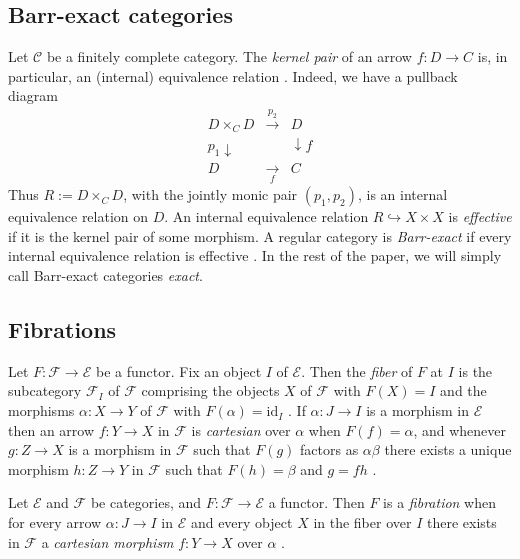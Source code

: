 \documentclass[12pt]{amsart}
\theoremstyle{definition}
\begin{document}
\subsection{Barr-exact categories}

Let $\mathcal{C}$ be a finitely complete category. The \emph{kernel pair} of
an arrow $f:D\rightarrow C$ is, in particular, an (internal) equivalence
relation \cite[Lemma~2.2]{gran_introduction_2021}. Indeed, we have a
pullback diagram%
\begin{equation*}
\begin{array}{ccc}
D\times _{C}D & \overset{p_{2}}{\rightarrow } & D \\ 
p_{1}\downarrow &  & \downarrow f \\ 
D & \underset{f}{\rightarrow } & C%
\end{array}%
\end{equation*}%
Thus $R:=D\times _{C}D$, with the jointly monic pair $(p_{1},p_{2})$, is an
internal equivalence relation on $D$. An internal equivalence relation $%
R\hookrightarrow X\times X$ is \emph{effective} if it is the kernel pair of
some morphism. A regular category is \emph{Barr-exact} if every internal
equivalence relation is effective \cite[Definition~5]{carboni_regular_1998}.
In the rest of the paper, we will simply call Barr-exact categories \emph{%
exact}.

\subsection{Fibrations}

Let $F:\mathcal{F}\rightarrow \mathcal{E}$ be a functor. Fix an object $I$
of $\mathcal{E}$. Then the \emph{fiber} of $F$ at $I$ is the subcategory $%
\mathcal{F}_{I}$ of $\mathcal{F}$ comprising the objects $X$ of $\mathcal{F}$
with $F\left( X\right) =I$ and the morphisms $\alpha :X\rightarrow Y$ of $%
\mathcal{F}$ with $F\left( \alpha \right) =\mathrm{id}_{I}$ \cite[Definition
A.7.1]{borceux_malcev_2004}. If $\alpha :J\rightarrow I$ is a morphism in $%
\mathcal{E}$ then an arrow $f:Y\rightarrow X$ in $\mathcal{F}$ is \emph{%
cartesian} over $\alpha $ when $F\left( f\right) =\alpha $, and whenever $%
g:Z\rightarrow X$ is a morphism in $\mathcal{F}$ such that $F\left( g\right) 
$ factors as $\alpha \beta $ there exists a unique morphism $h:Z\rightarrow
Y $ in $\mathcal{F}$ such that $F\left( h\right) =\beta $ and $g=fh$ \cite[%
Definition A.7.2]{borceux_malcev_2004}.

Let $\mathcal{E}$ and $\mathcal{F}$ be categories, and $F:\mathcal{F}%
\rightarrow \mathcal{E}$ a functor. Then $F$ is a \emph{fibration} when for
every arrow $\alpha :J\rightarrow I$ in $\mathcal{E}$ and every object $X$
in the fiber over $I$ there exists in $\mathcal{F}$ a \emph{cartesian
morphism} $f:Y\rightarrow X$ over $\alpha $ \cite[Definition A.7.3]%
{borceux_malcev_2004}.
\end{document}
